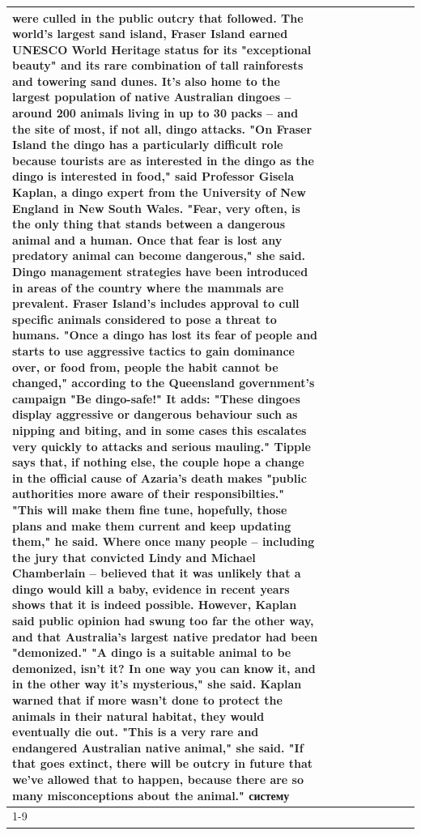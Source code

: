 \begin{table}[H]
\begin{tabular}{lllrlllll}
were culled in the public outcry that followed. The world's largest sand island, Fraser Island earned UNESCO World Heritage status for its "exceptional beauty" and its rare combination of tall rainforests and towering sand dunes. It's also home to the largest population of native Australian dingoes -- around 200 animals living in up to 30 packs -- and the site of most, if not all, dingo attacks. "On Fraser Island the dingo has a particularly difficult role because tourists are as interested in the dingo as the dingo is interested in food," said Professor Gisela Kaplan, a dingo expert from the University of New England in New South Wales. "Fear, very often, is the only thing that stands between a dangerous animal and a human. Once that fear is lost any predatory animal can become dangerous," she said. Dingo management strategies have been introduced in areas of the country where the mammals are prevalent. Fraser Island's includes approval to cull specific animals considered to pose a threat to humans. "Once a dingo has lost its fear of people and starts to use aggressive tactics to gain dominance over, or food from, people the habit cannot be changed," according to the Queensland government's campaign "Be dingo-safe!" It adds: "These dingoes display aggressive or dangerous behaviour such as nipping and biting, and in some cases this escalates very quickly to attacks and serious mauling." Tipple says that, if nothing else, the couple hope a change in the official cause of Azaria's death makes "public authorities more aware of their responsibilties." "This will make them fine tune, hopefully, those plans and make them current and keep updating them," he said. Where once many people -- including the jury that convicted Lindy and Michael Chamberlain -- believed that it was unlikely that a dingo would kill a baby, evidence in recent years shows that it is indeed possible. However, Kaplan said public opinion had swung too far the other way, and that Australia's largest native predator had been "demonized." "A dingo is a suitable animal to be demonized, isn't it? In one way you can know it, and in the other way it's mysterious," she said. Kaplan warned that if more wasn't done to protect the animals in their natural habitat, they would eventually die out. "This is a very rare and endangered Australian native animal," she said. "If that goes extinct, there will be outcry in future that we've allowed that to happen, because there are so many misconceptions about the animal." систему \\
\cline{1-9}

\end{tabular}
\end{table}

